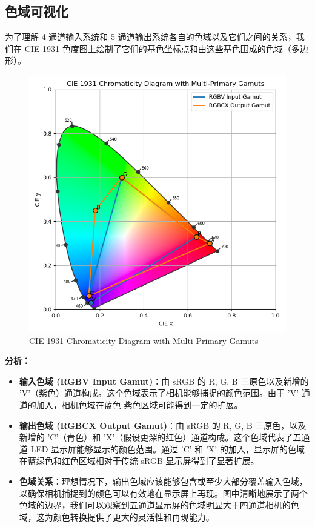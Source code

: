 \subsection[\hspace{-2pt}色域可视化]{{\heiti{} \hspace{-8pt}色域可视化}}\label{section2: 色域可视化}

为了理解 4 通道输入系统和 5 通道输出系统各自的色域以及它们之间的关系，我们在 CIE 1931 色度图上绘制了它们的基色坐标点和由这些基色围成的色域（多边形）。



\begin{figure}[h!]
\centering
{}
\includegraphics[width=0.8\columnwidth]{figures/色度图.png} %
\caption[CIE 1931 Chromaticity Diagram with Multi-Primary Gamuts]{CIE 1931 Chromaticity Diagram with Multi-Primary Gamuts}
\label{figure2: chromaticity_diagram}
\end{figure}

\textbf{分析：}
\begin{itemize}
    \item \textbf{输入色域 (RGBV Input Gamut)}：由 sRGB 的 R, G, B 三原色以及新增的 'V'（紫色）通道构成。这个色域表示了相机能够捕捉的颜色范围。由于 'V' 通道的加入，相机色域在蓝色-紫色区域可能得到一定的扩展。
    \item \textbf{输出色域 (RGBCX Output Gamut)}：由 sRGB 的 R, G, B 三原色，以及新增的 'C'（青色）和 'X'（假设更深的红色）通道构成。这个色域代表了五通道 LED 显示屏能够显示的颜色范围。通过 'C' 和 'X' 的加入，显示屏的色域在蓝绿色和红色区域相对于传统 sRGB 显示屏得到了显著扩展。
    \item \textbf{色域关系}：理想情况下，输出色域应该能够包含或至少大部分覆盖输入色域，以确保相机捕捉到的颜色可以有效地在显示屏上再现。图中清晰地展示了两个色域的边界，我们可以观察到五通道显示屏的色域明显大于四通道相机的色域，这为颜色转换提供了更大的灵活性和再现能力。
\end{itemize}


